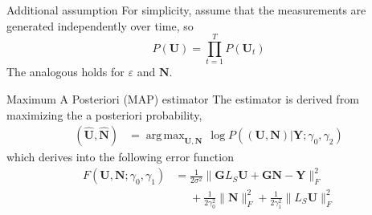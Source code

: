 \documentclass[progressbar=head]{beamer}
\newcommand{\set}[1]{ \left\{ #1 \right\} }
\newcommand{\ppar}[1]{ \left( #1 \right) }
\newcommand{\spar}[1]{ \left[ #1 \right] }
\DeclareMathOperator*{\argmax}{arg\,max}
\newcommand{\nnorm}[1]{\lVert #1 \rVert}
\newcommand{\J}{\mathbf{J}}
\newcommand{\Y}{\mathbf{Y}}
\newcommand{\G}{\mathbf{G}}
\newcommand{\U}{\mathbf{U}}
\newcommand{\N}{\mathbf{N}}
\newcommand{\SIG}{\mathbf{\Sigma}}
\newcommand{\ga}{\pmb{\gamma}}
\newcommand{\jt}{\mathbf{j}}
\begin{document}
\begin{frame}{Additional assumption}
For simplicity, assume that
the measurements are generated independently over time, so
\begin{equation}
    P\ppar{ \U } = \prod_{t=1}^T P\ppar{ \U_t }
\end{equation}
The analogous holds for $\varepsilon$ and $\N$.
\end{frame}

\begin{frame}{Maximum A Posteriori (MAP) estimator}
The estimator is derived from maximizing the a posteriori probability,
\begin{align}
    \ppar{ \hat{\U}, \hat{\N} } &=
    \argmax_{\U, \N }\,
    \log P\ppar{\ppar{ {\U}, {\N} } \Big| {\Y; \gamma_0, \gamma_2} }
\end{align}
which derives into the following error function
\begin{align}
    F\ppar{ {\U}, {\N};  \gamma_0, \gamma_1} &=
    \frac{1}{2\sigma^2}
    \nnorm{\G L_S \U + \G \N - \Y}_F^2
    \nonumber \\
    &\phantom{=}
    +
    \frac{1}{2\gamma_0^2} \nnorm{\N}_F^2
    +
    \frac{1}{2\gamma_1^2} \nnorm{L_S \U}_F^2
\end{align}
\end{frame}

\end{document}
